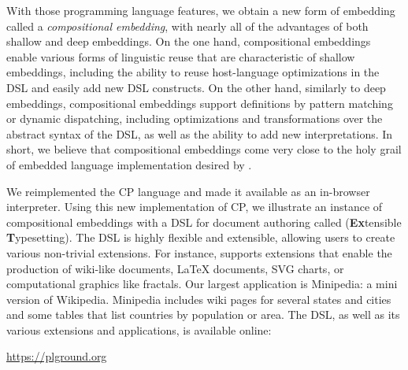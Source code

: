 With those programming language features, we obtain a new form of embedding
called a \emph{compositional embedding}, with nearly all of the advantages of
both shallow and deep embeddings. On the one hand, compositional embeddings
enable various forms of linguistic reuse that are characteristic of shallow
embeddings, including the ability to reuse host-language optimizations in the
DSL and easily add new DSL constructs. On the other hand, similarly to deep
embeddings, compositional embeddings support definitions by pattern matching or
dynamic dispatching, including optimizations and transformations over the
abstract syntax of the DSL, as well as the ability to add new interpretations.
In short, we believe that compositional embeddings come very close to the holy
grail of embedded language implementation desired by
\citet{svenningsson2015combining}.

We reimplemented the CP language and made it available as an in-browser
interpreter. Using this new implementation of CP, we illustrate an instance of
compositional embeddings with a DSL for document authoring called \ExT
(\textbf{Ex}tensible \textbf{T}ypesetting). The DSL is highly flexible and
extensible, allowing users to create various non-trivial extensions. For
instance, \ExT supports extensions that enable the production of wiki-like
documents, \LaTeX{} documents, SVG charts, or computational graphics like
fractals. Our largest application is Minipedia: a mini version of Wikipedia.
Minipedia includes wiki pages for several states and cities and some tables that
list countries by population or area. The \ExT DSL, as well as its various
extensions and applications, is available online:
\begin{center}
  \url{https://plground.org}
\end{center}
